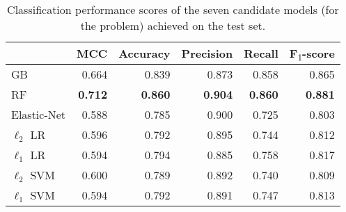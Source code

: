\begin{table}
\centering
\begin{tabular}{lrrrrr}
\toprule
{} &       MCC &  Accuracy &  Precision &    Recall &        F\textsubscript{$1$}-score \\
\midrule
GB             &  0.664 &  0.839 &   0.873 &  0.858 &  0.865 \\
RF             &  \textbf{0.712} &  \textbf{0.860} &   \textbf{0.904} &  \textbf{0.860} &  \textbf{0.881} \\
Elastic-Net    & 0.588 &  0.785 &   0.900 &  0.725 &  0.803 \\
$\ell_2$ LR    &  0.596 &  0.792 &   0.895 &  0.744 &  0.812 \\
$\ell_1$ LR    &  0.594 &  0.794 &   0.885 &  0.758 &  0.817 \\
$\ell_2$ SVM   &  0.600 &  0.789 &   0.892 &  0.740 &  0.809 \\
$\ell_1$ SVM   &  0.594 &  0.792 &   0.891 &  0.747 &  0.813 \\
\bottomrule
\end{tabular}

\caption{Classification performance scores of the seven candidate models (for the \F problem) achieved on the test set.} \label{tab:f_final_scores}
\end{table}
